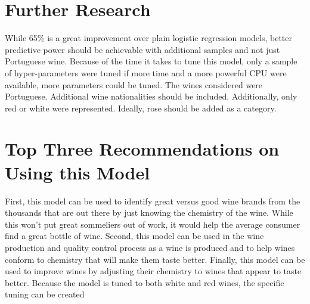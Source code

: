 \documentclass[]{article}
\begin{document}
\section{Further Research}
While 65\% is a great improvement over plain logistic regression models, better predictive power should be achievable with additional samples and not just Portuguese wine.  Because of the time it takes to tune this model, only a sample of hyper-parameters were tuned if more time and a more powerful CPU were available, more parameters could be tuned. The wines considered were Portuguese.  Additional wine nationalities should be included.  Additionally, only red or white were represented.  Ideally, rose should be added as a category.

\section{Top Three Recommendations on Using this Model}
First, this model can be used to identify great versus good wine brands from the thousands that are out there by just knowing the chemistry of the wine.  While this won't put great sommeliers out of work, it would help the average consumer find a great bottle of wine.  Second, this model can be used in the wine production and quality control process as a wine is produced and to help wines conform to chemistry that will make them taste better.  Finally, this model can be used to improve wines by adjusting their chemistry to wines that appear to taste better.  Because the model is tuned to both white and red wines, the specific tuning can be created   
    
\end{document}
